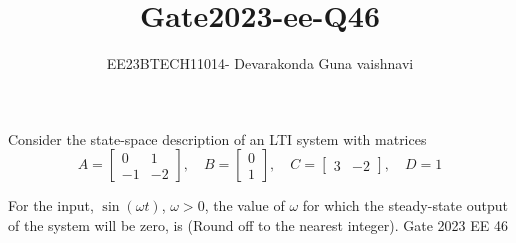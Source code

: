 \documentclass[12pt]{article}
\title{Gate2023-ee-Q46}
\author{EE23BTECH11014- Devarakonda Guna vaishnavi}
\begin{document}
\maketitle

Consider the state-space description of an LTI system with matrices
\[ 
A = \begin{bmatrix} 0 & 1 \\ -1 & -2 \end{bmatrix}, \quad 
B = \begin{bmatrix} 0 \\ 1 \end{bmatrix}, \quad 
C = \begin{bmatrix} 3 & -2 \end{bmatrix}, \quad 
D = 1 
\]

For the input, $\sin(\omega t)$, $\omega > 0$, the value of $\omega$ for which the steady-state output of the system will be zero, is \underline{\hspace{2cm}} (Round off to the nearest integer).
\hfill Gate 2023 EE 46

\end{document}
